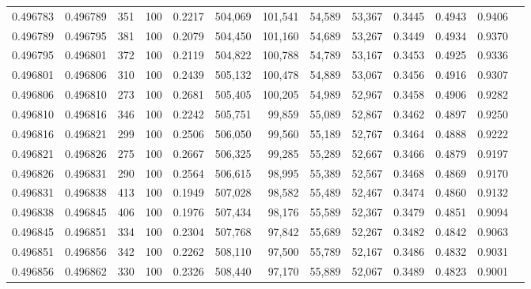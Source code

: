 \begin{tabular}{rrrrrrrrrrrrr}
0.496783 & 0.496789 &   351 & 100 &                                     0.2217 & 504,069 & 101,541 &  54,589 &  53,367 & 0.3445 & 0.4943 & 0.9406 \\
0.496789 & 0.496795 &   381 & 100 &                                     0.2079 & 504,450 & 101,160 &  54,689 &  53,267 & 0.3449 & 0.4934 & 0.9370 \\
0.496795 & 0.496801 &   372 & 100 &                                     0.2119 & 504,822 & 100,788 &  54,789 &  53,167 & 0.3453 & 0.4925 & 0.9336 \\
0.496801 & 0.496806 &   310 & 100 &                                     0.2439 & 505,132 & 100,478 &  54,889 &  53,067 & 0.3456 & 0.4916 & 0.9307 \\
0.496806 & 0.496810 &   273 & 100 &                                     0.2681 & 505,405 & 100,205 &  54,989 &  52,967 & 0.3458 & 0.4906 & 0.9282 \\
0.496810 & 0.496816 &   346 & 100 &                                     0.2242 & 505,751 &  99,859 &  55,089 &  52,867 & 0.3462 & 0.4897 & 0.9250 \\
0.496816 & 0.496821 &   299 & 100 &                                     0.2506 & 506,050 &  99,560 &  55,189 &  52,767 & 0.3464 & 0.4888 & 0.9222 \\
0.496821 & 0.496826 &   275 & 100 &                                     0.2667 & 506,325 &  99,285 &  55,289 &  52,667 & 0.3466 & 0.4879 & 0.9197 \\
0.496826 & 0.496831 &   290 & 100 &                                     0.2564 & 506,615 &  98,995 &  55,389 &  52,567 & 0.3468 & 0.4869 & 0.9170 \\
0.496831 & 0.496838 &   413 & 100 &                                     0.1949 & 507,028 &  98,582 &  55,489 &  52,467 & 0.3474 & 0.4860 & 0.9132 \\
0.496838 & 0.496845 &   406 & 100 &                                     0.1976 & 507,434 &  98,176 &  55,589 &  52,367 & 0.3479 & 0.4851 & 0.9094 \\
0.496845 & 0.496851 &   334 & 100 &                                     0.2304 & 507,768 &  97,842 &  55,689 &  52,267 & 0.3482 & 0.4842 & 0.9063 \\
0.496851 & 0.496856 &   342 & 100 &                                     0.2262 & 508,110 &  97,500 &  55,789 &  52,167 & 0.3486 & 0.4832 & 0.9031 \\
0.496856 & 0.496862 &   330 & 100 &                                     0.2326 & 508,440 &  97,170 &  55,889 &  52,067 & 0.3489 & 0.4823 & 0.9001 \\

\end{tabular}

